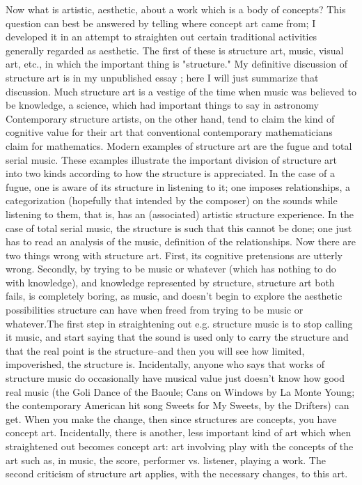 Now what is artistic, aesthetic, about a work which is a body of 
concepts? This question can best be answered by telling where concept art 
came from; I developed it in an attempt to straighten out certain traditional 
activities generally regarded as aesthetic. The first of these is structure art, 
music, visual art, etc., in which the important thing is "structure." My 
definitive discussion of structure art is in my unpublished essay ; here I will just summarize that discussion. Much 
structure art is a vestige of the time when \eg music was believed to be 
knowledge, a science, which had important things to say in astronomy \etc
Contemporary structure artists, on the other hand, tend to claim the kind of 
cognitive value for their art that conventional contemporary mathematicians 
claim for mathematics. Modern examples of structure art are the fugue and 
total serial music. These examples illustrate the important division of 
structure art into two kinds according to how the structure is appreciated. In 
the case of a fugue, one is aware of its structure in listening to it; one 
imposes relationships, a categorization (hopefully that intended by the 
composer) on the sounds while listening to them, that is, has an (associated) 
artistic structure experience. In the case of total serial music, the structure is 
such that this cannot be done; one just has to read an analysis of the 
music, definition of the relationships. Now there are two things wrong with 
structure art. First, its cognitive pretensions are utterly wrong. Secondly, by 
trying to be music or whatever (which has nothing to do with knowledge), 
and knowledge represented by structure, structure art both fails, is 
completely boring, as music, and doesn't begin to explore the aesthetic 
possibilities structure can have when freed from trying to be music or 
whatever.The first step in straightening out e.g. structure music is to stop 
calling it music, and start saying that the sound is used only to carry the 
structure and that the real point is the structure--and then you will see how 
limited, impoverished, the structure is. Incidentally, anyone who says that 
works of structure music do occasionally have musical value just doesn't 
know how good real music (the Goli Dance of the Baoule; Cans on Windows 
by La Monte Young; the contemporary American hit song Sweets for My 
Sweets, by the Drifters) can get. When you make the change, then since 
structures are concepts, you have concept art. Incidentally, there is another, 
less important kind of art which when straightened out becomes concept art: 
art involving play with the concepts of the art such as, in music, the score, 
performer vs. listener, playing a work. The second criticism of structure art 
applies, with the necessary changes, to this art. 

